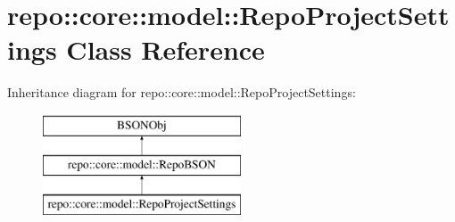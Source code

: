 \hypertarget{classrepo_1_1core_1_1model_1_1_repo_project_settings}{}\section{repo\+:\+:core\+:\+:model\+:\+:Repo\+Project\+Settings Class Reference}
\label{classrepo_1_1core_1_1model_1_1_repo_project_settings}
Inheritance diagram for repo\+:\+:core\+:\+:model\+:\+:Repo\+Project\+Settings\+:\begin{figure}[H]
\begin{center}
\leavevmode
\includegraphics[height=3.000000cm]{classrepo_1_1core_1_1model_1_1_repo_project_settings}
\end{center}
\end{figure}
